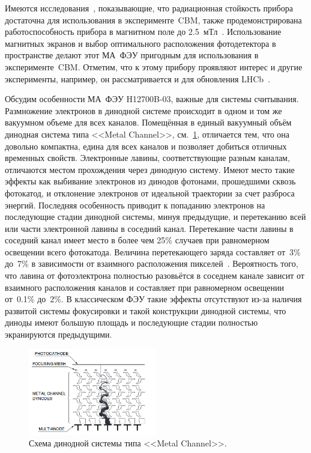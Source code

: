 Имеются исследования~\cite{}, показывающие, что радиационная стойкость прибора достаточна для использования в эксперименте~CBM, также продемонстрирована работоспособность прибора в магнитном поле до 2.5~мТл~\cite{}. Использование магнитных экранов и выбор оптимального расположения фотодетектора в пространстве делают этот МА~ФЭУ пригодным для использования в эксперименте~CBM. Отметим, что к этому прибору проявляют интерес и другие эксперименты, например, он рассматривается и для обновления LHCb~\cite{}.

Обсудим особенности МА~ФЭУ H12700B-03, важные для системы считывания. Размножение электронов в динодной системе происходит в одном и том же вакуумном объеме для всех каналов. Помещённая в единый вакуумный объём динодная система типа <<Metal Channel>>, см.~\ref{fig:MetalChannel}, отличается тем, что она довольно компактна, едина для всех каналов и позволяет добиться отличных временных свойств. Электронные лавины, соответствующие разным каналам, отличаются местом прохождения через динодную систему. Имеют место такие эффекты как выбивание электронов из динодов фотонами, прошедшими сквозь фотокатод, и отклонение электронов от идеальной траектории за счет разброса энергий. Последняя особенность приводит к попаданию электронов на последующие стадии динодной системы, минуя предыдущие, и перетеканию всей или части электронной лавины в соседний канал. Перетекание части лавины в соседний канал имеет место в более чем 25\% случаев при равномерном освещении всего фотокатода. Величина перетекающего заряда составляет от~3\% до~7\% в зависимости от взаимного расположения пикселей~\cite{}. Вероятность того, что лавина от фотоэлектрона полностью разовьётся в соседнем канале зависит от взаимного расположения каналов и составляет при равномерном освещении от~0.1\% до~2\%. В классическом ФЭУ такие эффекты отсутствуют из-за наличия развитой системы фокусировки и такой конструкции динодной системы, что диноды имеют большую площадь и последующие стадии полностью экранируются предыдущими.

\begin{figure}
\includegraphics[width=0.5\textwidth]{pictures/2_Metal_channel.png}
\caption{Схема динодной системы типа <<Metal Channel>>.}
\label{fig:MetalChannel}
\end{figure}

